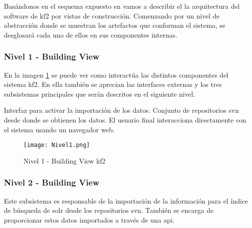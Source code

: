 Basándonos en el esquema expuesto en \cite{arc42} vamos a describir el la arquitectura del \gls{software} de \gls{kf2} por vistas de construcción. Comenzando por un nivel de abstracción donde se muestran los artefactos que conforman el sistema, se desglosará cada uno de ellos en sus componentes internas.\\

\subsubsection{Nivel 1 - Building View}
En la imagen \ref{image:level1} se puede ver como interactúa las distintos componentes del sistema \gls{kf2}. En ella también se aprecian las interfaces externas y los tres subsistemas principales que serán descritos en el siguiente nivel.
\begin{itemize}
	 Interfaz para activar la importación de los datos.
     Conjunto de repositorios \gls{svn} desde donde se obtienen los datos.
     El usuario final interacciona directamente con el sistema usando un navegador web.
\end{itemize}

\begin{figure}[H]
  \centering
     \texttt{[image: Nivel1.png]}
  \caption{Nivel 1 - Building View \gls{kf2}}
  \label{image:level1}
\end{figure}


\subsubsection{Nivel 2 - Building View}
\label{subsubsection:n2building}
Este subsistema es responsable de la importación de la información para el índice de búsqueda de \gls{solr} desde los repositorios \gls{svn}. También se encarga de proporcionar estos datos importados a través de una \gls{api}. \\

